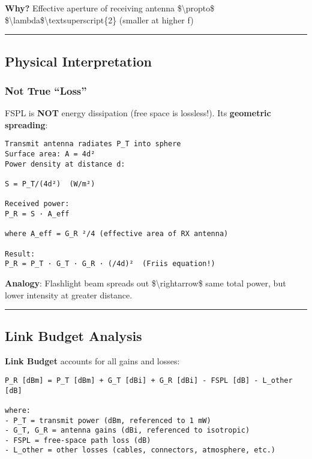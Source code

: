 \textbf{Why?} Effective aperture of receiving antenna
\$\textbackslash propto\$
\$\textbackslash lambda\$\textbackslash textsuperscript\{2\} (smaller at
higher f)

\begin{center}\rule{0.5\linewidth}{0.5pt}\end{center}

\subsection{\texorpdfstring{ Physical
Interpretation}{ Physical Interpretation}}\label{physical-interpretation}

\subsubsection{Not True ``Loss''}\label{not-true-loss}

FSPL is \textbf{NOT} energy dissipation (free space is lossless!).
It\textquotesingle s \textbf{geometric spreading}:

\begin{verbatim}
Transmit antenna radiates P_T into sphere
Surface area: A = 4d²
Power density at distance d:

S = P_T/(4d²)  (W/m²)

Received power:
P_R = S · A_eff

where A_eff = G_R ²/4 (effective area of RX antenna)

Result:
P_R = P_T · G_T · G_R · (/4d)²  (Friis equation!)
\end{verbatim}

\textbf{Analogy}: Flashlight beam spreads out
\$\textbackslash rightarrow\$ same total power, but lower intensity at
greater distance.

\begin{center}\rule{0.5\linewidth}{0.5pt}\end{center}

\subsection{\texorpdfstring{ Link Budget
Analysis}{ Link Budget Analysis}}\label{link-budget-analysis}

\textbf{Link Budget} accounts for all gains and losses:

\begin{verbatim}
P_R [dBm] = P_T [dBm] + G_T [dBi] + G_R [dBi] - FSPL [dB] - L_other [dB]

where:
- P_T = transmit power (dBm, referenced to 1 mW)
- G_T, G_R = antenna gains (dBi, referenced to isotropic)
- FSPL = free-space path loss (dB)
- L_other = other losses (cables, connectors, atmosphere, etc.)
\end{verbatim}

